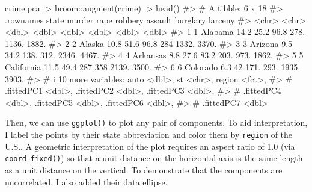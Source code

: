 \documentclass[
  letterpaper,
  10pt,
  krantz2]{krantz}
\makeatletter
\newenvironment{Shaded}{\begin{snugshade}}{\end{snugshade}}
\newcommand{\CommentTok}[1]{\textcolor[rgb]{0.37,0.37,0.37}{#1}}
\newcommand{\FunctionTok}[1]{\textcolor[rgb]{0.28,0.35,0.67}{#1}}
\newcommand{\NormalTok}[1]{\textcolor[rgb]{0.00,0.23,0.31}{#1}}
\newcommand{\SpecialCharTok}[1]{\textcolor[rgb]{0.37,0.37,0.37}{#1}}
\newenvironment{kframe}{%
  \medskip{}
  \setlength{\fboxsep}{.8em}
  \def\at@end@of@kframe{}%
  \ifinner\ifhmode%
  \def\at@end@of@kframe{\end{minipage}}%
  \begin{minipage}{\columnwidth}%
  \fi\fi%
  \def\FrameCommand##1{\hskip\@totalleftmargin \hskip-\fboxsep
  \colorbox{shadecolor}{##1}\hskip-\fboxsep
      \hskip-\linewidth \hskip-\@totalleftmargin \hskip\columnwidth}%
  \MakeFramed {\advance\hsize-\width
    \@totalleftmargin\z@ \linewidth\hsize
    \@setminipage}}%
{\par\unskip\endMakeFramed%
  \at@end@of@kframe}
\renewenvironment{Shaded}{\begin{kframe}}{\end{kframe}}
\makeatother
\begin{document}
\begin{Shaded}
\begin{Highlighting}[]
\NormalTok{crime.pca }\SpecialCharTok{|\textgreater{}}
\NormalTok{  broom}\SpecialCharTok{::}\FunctionTok{augment}\NormalTok{(crime) }\SpecialCharTok{|\textgreater{}} \FunctionTok{head}\NormalTok{()}
\CommentTok{\#\textgreater{} \# A tibble: 6 x 18}
\CommentTok{\#\textgreater{}   .rownames state      murder  rape robbery assault burglary larceny}
\CommentTok{\#\textgreater{}   \textless{}chr\textgreater{}     \textless{}chr\textgreater{}       \textless{}dbl\textgreater{} \textless{}dbl\textgreater{}   \textless{}dbl\textgreater{}   \textless{}dbl\textgreater{}    \textless{}dbl\textgreater{}   \textless{}dbl\textgreater{}}
\CommentTok{\#\textgreater{} 1 1         Alabama      14.2  25.2    96.8    278.    1136.   1882.}
\CommentTok{\#\textgreater{} 2 2         Alaska       10.8  51.6    96.8    284     1332.   3370.}
\CommentTok{\#\textgreater{} 3 3         Arizona       9.5  34.2   138.     312.    2346.   4467.}
\CommentTok{\#\textgreater{} 4 4         Arkansas      8.8  27.6    83.2    203.     973.   1862.}
\CommentTok{\#\textgreater{} 5 5         California   11.5  49.4   287      358     2139.   3500.}
\CommentTok{\#\textgreater{} 6 6         Colorado      6.3  42     171.     293.    1935.   3903.}
\CommentTok{\#\textgreater{} \# i 10 more variables: auto \textless{}dbl\textgreater{}, st \textless{}chr\textgreater{}, region \textless{}fct\textgreater{},}
\CommentTok{\#\textgreater{} \#   .fittedPC1 \textless{}dbl\textgreater{}, .fittedPC2 \textless{}dbl\textgreater{}, .fittedPC3 \textless{}dbl\textgreater{},}
\CommentTok{\#\textgreater{} \#   .fittedPC4 \textless{}dbl\textgreater{}, .fittedPC5 \textless{}dbl\textgreater{}, .fittedPC6 \textless{}dbl\textgreater{},}
\CommentTok{\#\textgreater{} \#   .fittedPC7 \textless{}dbl\textgreater{}}
\end{Highlighting}
\end{Shaded}

Then, we can use \texttt{ggplot()} to plot any pair of components. To
aid interpretation, I label the points by their state abbreviation and
color them by \texttt{region} of the U.S.. A geometric interpretation of
the plot requires an aspect ratio of 1.0 (via \texttt{coord\_fixed()})
so that a unit distance on the horizontal axis is the same length as a
unit distance on the vertical. To demonstrate that the components are
uncorrelated, I also added their data ellipse.
\end{document}
